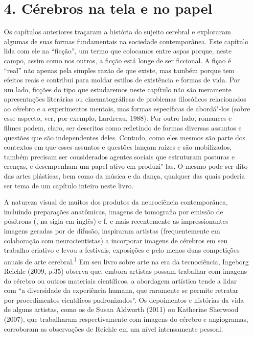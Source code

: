 \part{4. Cérebros na tela e no papel}

Os capítulos anteriores traçaram a história do sujeito cerebral e
exploraram algumas de suas formas fundamentais na sociedade
contemporânea. Este capítulo lida com ele na ``ficção'', um termo que
colocamos entre aspas porque, neste campo, assim como nos outros, a
ficção está longe de ser ficcional. A fiçao é ``real'' não apenas pela
simples razão de que existe, mas também porque tem efeitos reais e
contribui para moldar estilos de existência e formas de vida. Por um
lado, ficções do tipo que estudaremos neste capítulo não são meramente
apresentações literárias ou cinematográficas de problemas filosóficos
relacionados ao cérebro e a experimentos mentais, mas formas específicas
de abordá"-los (sobre esse aspecto, ver, por exemplo, Lardreau, 1988).
Por outro lado, romances e filmes podem, claro, ser descritos como
refletindo de formas diversas assuntos e questões que são independentes
deles. Contudo, como eles mesmos são parte dos contextos em que esses
assuntos e questões lançam raízes e são mobilizados, também precisam ser
considerados agentes sociais que estruturam posturas e crenças, e
desempenham um papel ativo em produzi"-las. O mesmo pode ser dito das
artes plásticas, bem como da música e da dança, qualquer das quais
poderia ser tema de um capítulo inteiro neste livro.

A natureza visual de muitos dos produtos da neurociência contemporânea,
incluindo preparações anatômicas, imagens de tomografia por emissão de
pósitrons (, na sigla em inglês) e f, e mais recentemente as
impressionantes imagens geradas por  de difusão, inspiraram artistas
(frequentemente em colaboração com neurocientistas) a incorporar imagens
de cérebros em seu trabalho criativo e levou a festivais, exposições e
pelo menos duas competições anuais de arte cerebral.\textsuperscript{1}
Em seu livro sobre arte na era da tecnociência, Ingeborg Reichle (2009,
p.35) observa que, embora artistas possam trabalhar com imagens do
cérebro ou outros materiais científicos, a abordagem artística tende a
lidar com ``a diversidade da experiência humana, que raramente se
permite retratar por procedimentos científicos padronizados''. Os
depoimentos e histórias da vida de alguns artistas, como os de Susan
Aldworth (2011) ou Katherine Sherwood (2007), que trabalharam
respectivamente com imagens do cérebro e angiogramas, corroboram as
observações de Reichle em um nível intensamente pessoal.

